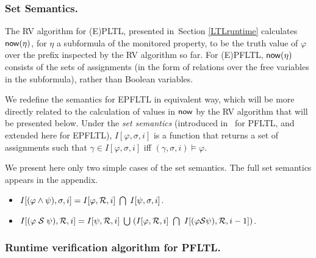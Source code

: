 

\fi

\subsubsection{Set Semantics.}

The RV algorithm for
(E)PLTL, presented in~Section \ref{LTLruntime}
calculates
$\mathsf{now} ( \eta )$, for $\eta$ a
subformula of the monitored property, to be the
truth value of $\varphi$ over the
prefix inspected by the RV algorithm so far. For (E)PFLTL,
$\mathsf{now} (\eta )$ consists of the
sets of assignments (in the form of relations
over the free variables in the subformula),
rather than Boolean variables.


We redefine the semantics for EPFLTL in
equivalent way, which will be more directly related to the calculation of values
in $\mathsf{now}$ by the
RV algorithm that will be presented below. 
Under the  {\em set semantics}
(introduced in~\cite{HPU} for PFLTL, and extended here for EPFLTL),
$I [ \varphi , \sigma, i ]$ is a function that returns
a set of assignments such that $\gamma \in I [ \varphi , \sigma, i ]$ 
iff $( \gamma , \sigma , i ) \models \varphi$.

We present here only two simple cases of the set semantics. The full set semantics appears in the appendix. 
\begin{itemize}
\item $I [ ( \varphi \wedge \psi ) , \sigma , i ] = 
I [ \varphi , {\cal R} , i ] \;  \bigcap \; I [ \psi , \sigma , i ]$.
\item $I [ ( \varphi \; \since \; \psi ) , {\cal R} , i ] = 
I [ \psi , {\cal R}, i ] \; \bigcup \;
( I [ \varphi , {\cal R} , i ] \ \bigcap \ 
I [ (\varphi \since \psi ) , {\cal R} , i - 1 ] )$.
\end{itemize}



\subsubsection{Runtime verification algorithm for PFLTL.}

